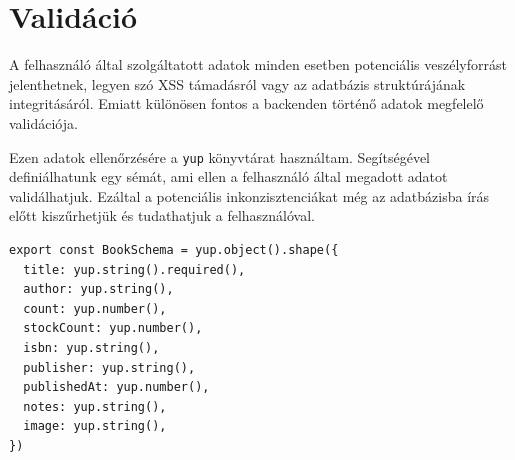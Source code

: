 \section{Validáció}

A felhasználó által szolgáltatott adatok minden esetben potenciális veszélyforrást jelenthetnek, legyen szó XSS támadásról
vagy az adatbázis struktúrájának integritásáról. Emiatt különösen fontos a backenden történő adatok megfelelő validációja.

Ezen adatok ellenőrzésére a \lstinline|yup| könyvtárat használtam. Segítségével definiálhatunk egy sémát, ami ellen
a felhasználó által megadott adatot validálhatjuk. Ezáltal a potenciális inkonzisztenciákat még az adatbázisba írás előtt
kiszűrhetjük és tudathatjuk a felhasználóval.

\begin{lstlisting}[caption=yup validációs séma a könyvekre]
export const BookSchema = yup.object().shape({
  title: yup.string().required(),
  author: yup.string(),
  count: yup.number(),
  stockCount: yup.number(),
  isbn: yup.string(),
  publisher: yup.string(),
  publishedAt: yup.number(),
  notes: yup.string(),
  image: yup.string(),
})
\end{lstlisting}
